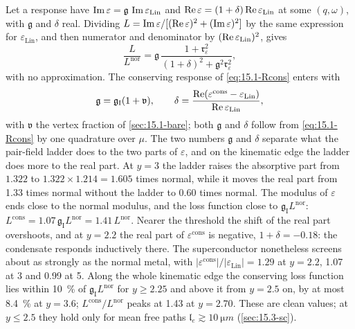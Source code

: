 Let a response have $\operatorname{Im}\varepsilon = \mathfrak{g}\,\operatorname{Im}\varepsilon_{\mathrm{Lin}}$ and $\operatorname{Re}\varepsilon = (1 + \delta)\operatorname{Re}\varepsilon_{\mathrm{Lin}}$ at some $(q,\omega)$, with $\mathfrak{g}$ and $\delta$ real. Dividing $L = \operatorname{Im}\varepsilon/[(\operatorname{Re}\varepsilon)^2 + (\operatorname{Im}\varepsilon)^2]$ by the same expression for $\varepsilon_{\mathrm{Lin}}$, and then numerator and denominator by $(\operatorname{Re}\varepsilon_{\mathrm{Lin}})^2$, gives
\begin{equation}
  \frac{L}{L^{\mathrm{nor}}} = \mathfrak{g}\,\frac{1 + \mathfrak{r}_\varepsilon^2}{(1 + \delta)^2 + \mathfrak{g}^2\mathfrak{r}_\varepsilon^2} ,
  \label{eq:D.39-resum}
\end{equation}
with no approximation. The conserving response of \cref{eq:15.1-Rcons} enters with
\begin{equation}
  \mathfrak{g} = \mathfrak{g}_{\mathrm{I}}(1 + \mathfrak{v}) , \qquad
  \delta = \frac{\operatorname{Re}(\varepsilon^{\mathrm{cons}} - \varepsilon_{\mathrm{Lin}})}{\operatorname{Re}\varepsilon_{\mathrm{Lin}}} ,
  \label{eq:15.2-cons}
\end{equation}
with $\mathfrak{v}$ the vertex fraction of \cref{sec:15.1-bare}; both $\mathfrak{g}$ and $\delta$ follow from \cref{eq:15.1-Rcons} by one quadrature over $\mu$. The two numbers $\mathfrak{g}$ and $\delta$ separate what the pair-field ladder does to the two parts of $\varepsilon$, and on the kinematic edge the ladder does more to the real part. At $y = 3$ the ladder raises the absorptive part from $1.322$ to $1.322 \times 1.214 = 1.605$ times normal, while it moves the real part from 1.33 times normal without the ladder to 0.60 times normal. The modulus of $\varepsilon$ ends close to the normal modulus, and the loss function close to $\mathfrak{g}_{\mathrm{I}}L^{\mathrm{nor}}$: $L^{\mathrm{cons}} = 1.07\,\mathfrak{g}_{\mathrm{I}}L^{\mathrm{nor}} = 1.41\,L^{\mathrm{nor}}$. Nearer the threshold the shift of the real part overshoots, and at $y = 2.2$ the real part of $\varepsilon^{\mathrm{cons}}$ is negative, $1 + \delta = -0.18$: the condensate responds inductively there. The superconductor nonetheless screens about as strongly as the normal metal, with $|\varepsilon^{\mathrm{cons}}|/|\varepsilon_{\mathrm{Lin}}| = 1.29$ at $y = 2.2$, 1.07 at 3 and 0.99 at 5. Along the whole kinematic edge the conserving loss function lies within \SI{10}{\percent} of $\mathfrak{g}_{\mathrm{I}}L^{\mathrm{nor}}$ for $y \ge 2.25$ and above it from $y = 2.5$ on, by at most \SI{8.4}{\percent} at $y = 3.6$; $L^{\mathrm{cons}}/L^{\mathrm{nor}}$ peaks at 1.43 at $y = 2.70$. These are clean values; at $y \le 2.5$ they hold only for mean free paths $\mathfrak{l}_e \gtrsim \SI{10}{\micro m}$ (\cref{sec:15.3-sc}).

